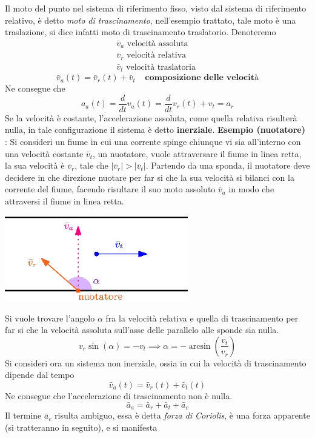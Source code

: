 \documentclass[10pt, letterpaper]{report}
\begin{document}
\acc 
Il moto del punto nel sistema di riferimento fisso, visto dal sistema di riferimento relativo, è 
detto \textit{moto di trascinamento}, nell'esempio trattato, tale moto è una traslazione, si dice 
infatti moto di trascinamento traslatorio. Denoteremo $$ \begin{matrix}
    \bar v_a \text{ velocità assoluta }\\ 
    \bar v_r \text{ velocità relativa }\\ 
    \bar v_t \text{ velocità traslatoria }
\end{matrix}$$ 
$$\bar v_a(t)=\bar v_r(t)+\bar v_t \ \ \ \ \ \textbf{composizione delle velocità}$$ 
Ne consegue che 
$$a_a(t)=\frac{d}{dt}v_a(t)=\frac{d}{dt}v_r(t)+v_t=a_r $$ 
Se la velocità è costante, l'accelerazione assoluta, come quella relativa risulterà nulla, in tale 
configurazione il sistema è detto \textbf{inerziale}.\acc 
\textbf{Esempio (nuotatore)} : Si consideri un fiume in cui una corrente spinge chiunque vi sia all'interno 
con una velocità costante $\bar v_t$, un nuotatore, vuole attraversare il fiume in linea retta, 
la sua velocità è $\bar v_r$, tale che $|\bar v_r|>|\bar v_t|$.\acc 
Partendo da una sponda, il nuotatore deve decidere in che direzione nuotare per far si che 
la sua velocità si bilanci con la corrente del fiume, facendo risultare il suo moto 
assoluto $\bar v_a$ in modo che attraversi il fiume in linea retta.
\begin{center}
    \includegraphics[width=0.6\textwidth]{images/nuotatore.eps}
\end{center}
Si vuole trovare l'angolo $\alpha$ fra la velocità relativa e quella di trascinamento per far 
si che la velocità assoluta sull'asse delle parallelo alle sponde sia nulla.
$$ v_r \sin(\alpha)=- v_t \implies \alpha = -\arcsin(\frac{v_t}{v_r}) $$ 
Si consideri ora un sistema non inerziale, ossia in cui la velocità di trascinamento dipende dal tempo 
$$\bar v_a(t) = \bar v_r(t) + \bar v_t(t) $$
Ne consegue che l'accelerazione di trascinamento non è nulla. 
$$\bar a_a = \bar a_r + \bar a_t + \bar a_c $$
Il termine $\bar a_c$ risulta ambiguo, essa è detta \textit{forza di Coriolis}, è una 
forza apparente (si tratteranno in seguito), e si manifesta 
\end{document}
